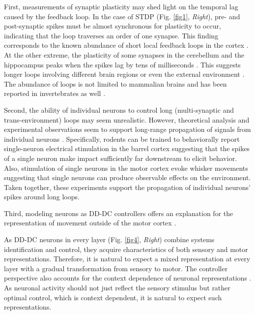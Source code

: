 \documentclass[9pt,twocolumn,twoside]{pnas-new}
\begin{document}
First, measurements of synaptic plasticity may shed light on the temporal lag caused by the feedback loop. In the case of STDP (Fig. \ref{fig1}, \textit{Right}), pre- and post-synaptic spikes must be almost synchronous for plasticity to occur, indicating that the loop traverses an order of one synapse. This finding corresponds to the known abundance of short local feedback loops in the cortex \citep{zilberter2000dendritic,song2005highly}. At the other extreme, the plasticity of some synapses in the cerebellum and the hippocampus peaks when the spikes lag by tens of milliseconds  \citep{dudman2007role, suvrathan2016timing}. This suggests longer loops involving different brain regions or even the external environment \citep{Jayabal2022.11.28.518128}. The abundance of loops is not limited to mammalian brains \citep{bell1999levels} and has been reported in invertebrates as well \citep{varshney2011structural,winding2023connectome}.

Second, the ability of individual neurons to control long (multi-synaptic and trans-environment) loops may seem unrealistic. However, theoretical analysis \citep{london2010sensitivity, monteforte2012dynamic} and experimental observations seem to support long-range propagation of signals from individual neurons \citep{wolfe2010sparse}. Specifically, rodents can be trained to behaviorally report single-neuron electrical stimulation in the barrel cortex \citep{houweling2008behavioural} suggesting that the spikes of a single neuron make impact sufficiently far downstream to elicit behavior. Also, stimulation of single neurons in the motor cortex evoke whisker movements \citep{brecht2004whisker} suggesting that single neurons can produce observable effects on the environment. Taken together, these experiments support the propagation of individual neurons' spikes around long loops.

Third, modeling neurons as DD-DC controllers offers an explanation for the representation of movement outside of the motor cortex \citep{musall2019single,zagha2022importance}.

As DD-DC neurons in every layer (Fig. \ref{fig4}, \textit{Right}) combine systems identification and control, they acquire characteristics of both sensory and motor representations. Therefore, it is natural to expect a mixed representation at every layer with a gradual transformation from sensory to motor. The controller perspective also accounts for the context dependence of neuronal representations \citep{niell2010modulation}. As neuronal activity should not just reflect the sensory stimulus but rather optimal control, which is context dependent, it is natural to expect such representations. 
\end{document}
